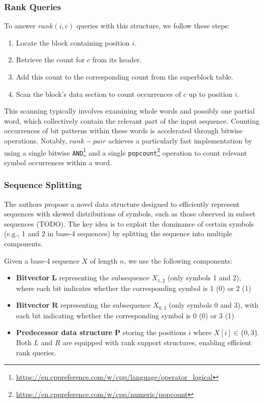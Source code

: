 \subsubsection*{Rank Queries}

\noindent To answer \(rank(i,c)\) queries with this structure, we follow these steps:
\begin{enumerate}
    \item Locate the block containing position \(i\).
    \item Retrieve the count for \(c\) from its header.
    \item Add this count to the corresponding count from the superblock table.
    \item Scan the block's data section to count occurrences of \(c\) up to position \(i\).
\end{enumerate}


\noindent This scanning typically involves examining whole words and possibly one partial word, which collectively contain the relevant part of the input sequence. Counting occurrences of bit patterns within these words is accelerated through bitwise operations. Notably, $rank-pair$ achieves a particularly fast implementation by using a single bitwise \texttt{AND}\footnote{\url{https://en.cppreference.com/w/cpp/language/operator_logical}} and a single \texttt{popcount}\footnote{\url{https://en.cppreference.com/w/cpp/numeric/popcount}} operation to count relevant symbol occurrences within a word.

\subsubsection{Sequence Splitting}

The authors propose a novel data structure designed to efficiently represent sequences with skewed distributions of symbols, such as those observed in subset sequences (TODO). The key idea is to exploit the dominance of certain symbols (e.g., 1 and 2 in base-4 sequences) by splitting the sequence into multiple components. \vspace{0.4cm}

\noindent Given a base-4 sequence \(X\) of length \(n\), we use the following components:
\begin{itemize}
    \item \textbf{Bitvector} \(\mathbf{L}\) representing the subsequence \(X_{1,2}\) (only symbols 1 and 2), where each bit indicates whether the corresponding symbol is 1 (0) or 2 (1)
    \item \textbf{Bitvector} \(\mathbf{R}\) representing the subsequence \(X_{0,3}\) (only symbols 0 and 3), with each bit indicating whether the corresponding symbol is 0 (0) or 3 (1)
    \item \textbf{Predecessor data structure} \(\mathbf{P}\) storing the positions \(i\) where \(X[i] \in \{0, 3\}\). Both \(L\) and \(R\) are equipped with rank support structures, enabling efficient rank queries.
\end{itemize}

